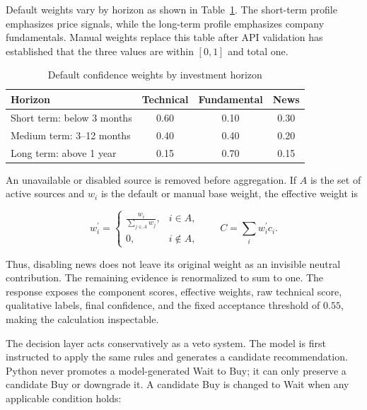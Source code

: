 Default weights vary by horizon as shown in Table~\ref{tab:confidence-horizon-weights}. The short-term profile emphasizes price signals, while the long-term profile emphasizes company fundamentals. Manual weights replace this table after API validation has established that the three values are within $[0,1]$ and total one.

\begin{table}[H]
    \centering
    \caption{Default confidence weights by investment horizon}
    \label{tab:confidence-horizon-weights}
    \small
    \renewcommand{\arraystretch}{1.2}
    \begin{tabular}{lccc}
        \toprule
        \textbf{Horizon} & \textbf{Technical} & \textbf{Fundamental} & \textbf{News} \\
        \midrule
        Short term: below 3 months & 0.60 & 0.10 & 0.30 \\
        Medium term: 3--12 months & 0.40 & 0.40 & 0.20 \\
        Long term: above 1 year & 0.15 & 0.70 & 0.15 \\
        \bottomrule
    \end{tabular}
\end{table}

An unavailable or disabled source is removed before aggregation. If $A$ is the set of active sources and $w_i$ is the default or manual base weight, the effective weight is

\begin{equation}
    w_i^{\prime} =
    \begin{cases}
        \displaystyle\frac{w_i}{\sum_{j \in A} w_j}, & i \in A,\\[6pt]
        0, & i \notin A,
    \end{cases}
    \qquad
    C = \sum_i w_i^{\prime}c_i.
    \label{eq:effective-confidence}
\end{equation}

Thus, disabling news does not leave its original weight as an invisible neutral contribution. The remaining evidence is renormalized to sum to one. The response exposes the component scores, effective weights, raw technical score, qualitative labels, final confidence, and the fixed acceptance threshold of $0.55$, making the calculation inspectable.

The decision layer acts conservatively as a veto system. The model is first instructed to apply the same rules and generates a candidate recommendation. Python never promotes a model-generated Wait to Buy; it can only preserve a candidate Buy or downgrade it. A candidate Buy is changed to Wait when any applicable condition holds:

